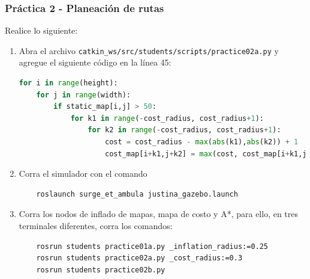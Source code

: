 \begin{frame}[containsverbatim]\frametitle{Práctica 2 - Planeación de rutas}
  Realice lo siguiente:
  \begin{enumerate}
     \item Abra el archivo \texttt{catkin\_ws/src/students/scripts/practice02a.py} y agregue el siguiente código en la línea 45:
  \begin{lstlisting}[language=Python,firstnumber=45]
for i in range(height):
    for j in range(width):
        if static_map[i,j] > 50:
            for k1 in range(-cost_radius, cost_radius+1):
                for k2 in range(-cost_radius, cost_radius+1):
                    cost = cost_radius - max(abs(k1),abs(k2)) + 1
                    cost_map[i+k1,j+k2] = max(cost, cost_map[i+k1,j+k2])
                  \end{lstlisting}
  \item Corra el simulador con el comando
\begin{verbatim}
    roslaunch surge_et_ambula justina_gazebo.launch
\end{verbatim}                  
  \item Corra los nodos de inflado de mapas, mapa de costo y A*, para ello, en tres terminales diferentes, corra los comandos:
\begin{verbatim}
    rosrun students practice01a.py _inflation_radius:=0.25
    rosrun students practice02a.py _cost_radius:=0.3
    rosrun students practice02b.py
\end{verbatim}
  \end{enumerate}
\end{frame}

